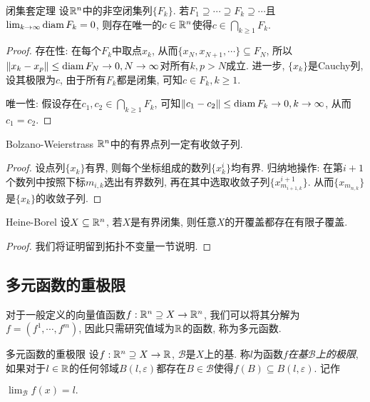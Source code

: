 \begin{theorem}{闭集套定理}
	设$\mathbb{R} ^n$中的非空闭集列$\{ F_k \}$. 若$F_1 \supseteq \cdots \supseteq F_k \supseteq \cdots$且$\lim_{k\to \infty} \operatorname{diam} F_k=0$, 则存在唯一的$c \in \mathbb{R} ^n$使得$c \in \bigcap_{k\geq 1} F_k$. 
\end{theorem}
\begin{proof}
	存在性: 在每个$F_k$中取点$x_k$, 从而$\{ x_N,x_{N+1},\cdots \} \subseteq F_N$, 所以$\| x_{k}-x_p \| \leq \operatorname{diam} F_N \to 0, N\to \infty$对所有$k,p >N$成立. 进一步, $\{ x_k \}$是Cauchy列, 设其极限为$c$, 由于所有$F_k$都是闭集, 可知$c \in F_k,k\geq 1$. 
	
	唯一性: 假设存在$c_1,c_2 \in \bigcap_{k\geq 1} F_k$, 可知$\| c_1-c_2 \| \leq \operatorname{diam} F_k \to 0, k\to \infty$, 从而$c_1=c_2$. 
\end{proof}

\begin{theorem}{Bolzano-Weierstrass}
	$\mathbb{R} ^n$中的有界点列一定有收敛子列. 
\end{theorem}
\begin{proof}
	设点列$\{ x_k \}$有界, 则每个坐标组成的数列$\{ x^i_k \}$均有界. 归纳地操作: 在第$i+1$个数列中按照下标$m_{{i,k}}$选出有界数列, 再在其中选取收敛子列$\{ x^{i+1}_{m_{i+1,k}} \}$. 从而$\{ x_{m_{n,k}} \}$是$\{ x_k \}$的收敛子列. 
\end{proof}

\begin{theorem}{Heine-Borel}
	设$X \subseteq \mathbb{R} ^n$, 若$X$是有界闭集, 则任意$X$的开覆盖都存在有限子覆盖. 
\end{theorem}
\begin{proof}
	我们将证明留到拓扑不变量一节说明. 
\end{proof}

\subsection{多元函数的重极限}

对于一般定义的向量值函数$f:\mathbb{R} ^n \supseteq X \to \mathbb{R} ^n$, 我们可以将其分解为$f=(f^1,\cdots ,f^m)$, 因此只需研究值域为$\mathbb{R}$的函数, 称为多元函数. 

\begin{definition}{多元函数的重极限}
	设$f: \mathbb{R} ^n \supseteq X \to \mathbb{R}$, $\mathcal{B}$是$X$上的基. 称$l$为函数$f$\textit{在基$\mathcal{B}$上的极限}, 如果对于$l \in \mathbb{R}$的任何邻域$B(l,\varepsilon)$都存在$B \in \mathcal{B}$使得$f(B) \subseteq B(l,\varepsilon)$. 记作
	\begin{center}
		$\displaystyle \lim_{\mathcal{B}}f(x)=l.$
	\end{center}
\end{definition}

